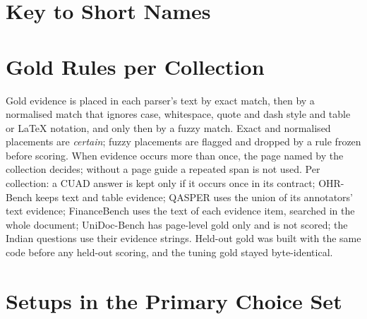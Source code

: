 
\FloatBarrier
\section{Key to Short Names}
\label{app:key}
\begin{table}[!htb]
\centering
{}
\caption{Short names used in the tables and figures.}
\label{tab:key}
\end{table}

\FloatBarrier
\section{Gold Rules per Collection}
\label{app:gold}

Gold evidence is placed in each parser's text by exact match, then by a
normalised match that ignores case, whitespace, quote and dash style and
table or LaTeX notation, and only then by a fuzzy match. Exact and
normalised placements are \emph{certain}; fuzzy placements are flagged and
dropped by a rule frozen before scoring. When evidence occurs more than
once, the page named by the collection decides; without a page guide a
repeated span is not used. Per collection: a CUAD answer is kept only if
it occurs once in its contract; OHR-Bench keeps text and table evidence;
QASPER uses the union of its annotators' text evidence; FinanceBench uses
the text of each evidence item, searched in the whole document;
UniDoc-Bench has page-level gold only and is not scored; the Indian
questions use their evidence strings. Held-out gold was built with the
same code before any held-out scoring, and the tuning gold stayed
byte-identical.

\FloatBarrier
\section{Setups in the Primary Choice Set}
\label{app:setups}

\begin{table}[!htb]
\centering
{}
\caption{Every chunker setting of the tuning grid in short names (Appendix~\ref{app:key}); each runs on both parsers.
Bold settings form the pre-specified primary choice set of RQ1.}
\label{tab:grid}
\end{table}

\begin{table}[!htb]
\centering
{}
\caption{Docling \DoclingVersion{} settings as listed in the run record of the default pipeline. The record lists no
table-structure mode.}
\label{tab:docling-settings}
\end{table}

